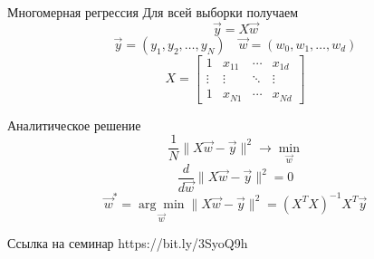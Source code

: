 \documentclass[aspectratio=169]{beamer}
\begin{document}
\begin{frame}{Многомерная регрессия}
    Для всей выборки получаем
    {\Large
        \[ \vec{y} = X \vec{w} \]
        \[ \vec{y} = (y_1, y_2, \dots, y_N) \quad \vec{w} = (w_0, w_1, \dots, w_d) \]
        \[
            X = \begin{bmatrix}
                1 & x_{11} & \cdots & x_{1d} \\
                \vdots & \vdots & \ddots & \vdots \\
                1 & x_{N1} & \cdots & x_{Nd}
            \end{bmatrix}
        \]
    }
\end{frame}

\begin{frame}{Аналитическое решение}
    \LARGE
    \[ \frac{1}{N} \| X \vec{w} - \vec{y} \|^2 \rightarrow \min_{\vec{w}} \]
    \pause
    \[ \frac{d}{d \vec{w}} \| X \vec{w} - \vec{y} \|^2 = 0 \]
    \pause
    \[
        \vec{w}^* = \underset{\vec{w}}{\arg\min} \| X \vec{w} - \vec{y} \|^2
        = {(X^T X)}^{-1} X^T \vec{y}
    \]
\end{frame}

\begin{frame}{Ссылка на семинар}
    \centering
    \LARGE
    https://bit.ly/3SyoQ9h
\end{frame}
\end{document}
